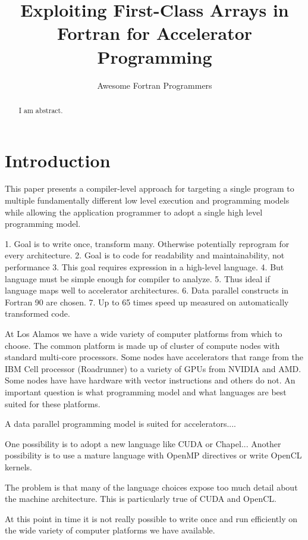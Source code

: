 \documentclass[10pt, conference, compsocconf]{IEEEtran}
\title{Exploiting First-Class Arrays in Fortran for Accelerator Programming}
\author{Awesome Fortran Programmers}
\begin{document}
\maketitle

\begin{abstract}
I am abstract.
\end{abstract}



\section{Introduction}

This paper presents a compiler-level approach for targeting a single
program to multiple fundamentally different low level execution and
programming models while allowing the application programmer to adopt
a single high level programming model.

1. Goal is to write once, transform many. Otherwise potentially reprogram for every architecture.
2. Goal is to code for readability and maintainability, not performance
3. This goal requires expression in a high-level language.
4. But language must be simple enough for compiler to analyze.
5. Thus ideal if language maps well to accelerator architectures.
6. Data parallel constructs in Fortran 90 are chosen.
7. Up to 65 times speed up measured on automatically transformed code.

At Los Alamos we have a wide variety of computer platforms from which
to choose.  The common platform is made up of cluster of compute nodes
with standard multi-core processors.  Some nodes have accelerators
that range from the IBM Cell processor (Roadrunner) to a variety of
GPUs from NVIDIA and AMD.  Some nodes have have hardware with vector
instructions and others do not.  An important question is what programming
model and what languages are best suited for these platforms.

A data parallel programming model is suited for accelerators....

One possibility is to adopt a new language like CUDA or Chapel...
Another possibility is to use a mature language with OpenMP directives
or write OpenCL kernels.

The problem is that many of the language choices expose too much detail
about the machine architecture.  This is particularly true of CUDA and OpenCL.

At this point in time it is not really possible to write once and
run efficiently on the wide variety of computer platforms we have
available.
\end{document}

